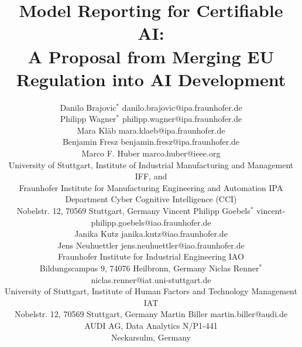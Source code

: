 \documentclass[twoside,11pt]{article}
\begin{document}
\title{Model Reporting for Certifiable AI:\\ A Proposal from Merging EU Regulation into AI Development}

\author{\name Danilo Brajovic$^*$            \email danilo.brajovic@ipa.fraunhofer.de \\
       \name Philipp Wagner$^*$              \email philipp.wagner@ipa.fraunhofer.de \\
       \name Mara Kläb                       \email mara.klaeb@ipa.fraunhofer.de \\
       \name Benjamin Fresz                  \email benjamin.fresz@ipa.fraunhofer.de \\
       \name Marco F. Huber                  \email marco.huber@ieee.org\\
       \addr University of Stuttgart, Institute of Industrial Manufacturing and Management IFF,   and\\ 
                Fraunhofer Institute for Manufacturing Engineering and Automation IPA\\ 
                Department Cyber Cognitive Intelligence (CCI)\\
                Nobelstr. 12, 70569 Stuttgart, Germany
\AND
       \name Vincent Philipp Goebels$^*$    \email vincent-philipp.goebels@iao.fraunhofer.de \\
       \name Janika Kutz                    \email janika.kutz@iao.fraunhofer.de \\
       \name Jens Neuhuettler               \email jens.neuhuettler@iao.fraunhofer.de \\
       \addr  Fraunhofer Institute for Industrial Engineering IAO\\
                Bildungscampus 9, 74076 Heilbronn, Germany
\AND
       \name Niclas Renner$^*$              \email niclas.renner@iat.uni-stuttgart.de \\
       \addr University of Stuttgart, Institute of Human Factors and Technology Management IAT\\
       Nobelstr. 12, 70569 Stuttgart, Germany
\AND
       \name Martin Biller                  \email martin.biller@audi.de \\
       \addr AUDI AG,
                Data Analytics N/P1-441 \\
                Neckarsulm, Germany
}




\maketitle
\end{document}
